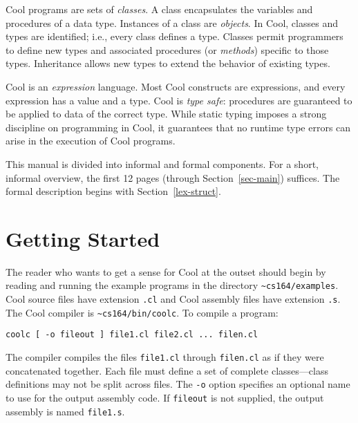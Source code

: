 Cool programs are sets of {\em classes}.  A class encapsulates the variables
and procedures of a data type.  Instances of a class are
{\em objects}.  In Cool, classes and types are identified; i.e., every
class defines a type.  Classes permit programmers to define new
types and associated procedures (or {\em methods}) specific to those
types.  Inheritance allows new types to extend the behavior of
existing types.

Cool is an {\em expression} language.  Most Cool constructs are
expressions, and every expression has a value and a type.  Cool is
{\em type safe}: procedures are guaranteed to be applied to data of
the correct type.  While static typing imposes a strong discipline on
programming in Cool, it guarantees that no runtime type errors can
arise in the execution of Cool programs.

This manual is divided into informal and formal components.  For a short,
informal overview, the first 12 pages (through Section~\ref{sec-main}) suffices.
The formal description begins with Section~\ref{lex-struct}.

\section{Getting Started}
\label{sec-start}

The reader who wants to get a sense for Cool at the outset should
begin by reading and running the example programs in the directory
{\tt \~{ }cs164/examples}.  Cool source files have extension {\tt .cl}
and Cool assembly files have extension {\tt .s}.
The Cool compiler is {\tt \~{ }cs164/bin/coolc}.  To compile a program:
\begin{verbatim}
coolc [ -o fileout ] file1.cl file2.cl ... filen.cl 
\end{verbatim}

The compiler compiles the files {\tt file1.cl} through {\tt filen.cl}
as if they were concatenated together.  Each file must define a
set of complete classes---class definitions may not be split across
files.  The {\tt -o} option specifies an optional name to use for the
output assembly code.  If {\tt fileout} is not supplied, the output
assembly is named {\tt file1.s}.

